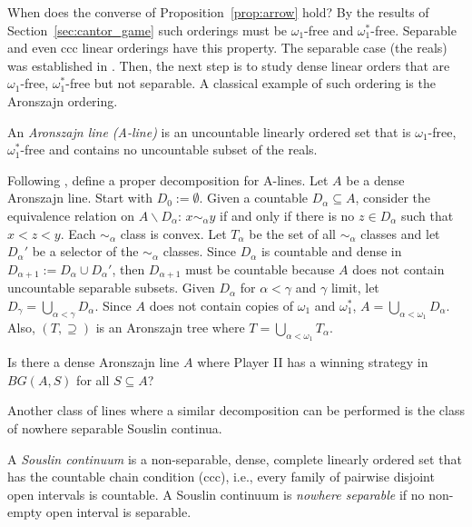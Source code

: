 When does the converse of Proposition~\ref{prop:arrow} hold?
By the results of Section~\ref{sec:cantor_game} such orderings must be $\omega_1$-free and $\omega_1^*$-free.
Separable and even ccc linear orderings have this property.
The separable case (the reals) was established in \cite{brian-clontz}.
Then, the next step is to study dense linear orders that are $\omega_1$-free, $\omega_1^*$-free but not separable.
A classical example of such ordering is the Aronszajn ordering.

\begin{definition}
    An \emph{Aronszajn line (A-line)} is an uncountable linearly ordered set that is $\omega_1$-free, $\omega_1^*$-free and contains no uncountable subset of the reals.
\end{definition}

Following \cite{A-orderings}, define a proper decomposition for A-lines.
Let $A$ be a dense Aronszajn line.
Start with $D_0:=\emptyset$.
Given a countable $D_\alpha\subseteq A$, consider the equivalence relation on $A\backslash D_\alpha$: $x\sim_\alpha y$ if and only if there is no $z\in D_\alpha$ such that $x<z<y$.
Each $\sim_\alpha$ class is convex.
Let $T_\alpha$ be the set of all $\sim_\alpha$ classes and let $D_\alpha'$ be a selector of the $\sim_\alpha$ classes.
Since $D_\alpha$ is countable and dense in $D_{\alpha+1}:=D_\alpha\cup D_\alpha'$, then $D_{\alpha+1}$ must be countable because $A$ does not contain uncountable separable subsets.
Given $D_\alpha$ for $\alpha<\gamma$ and $\gamma$ limit, let $D_\gamma=\bigcup_{\alpha<\gamma}D_\alpha$.
Since $A$ does not contain copies of $\omega_1$ and $\omega_1^*$, $A=\bigcup_{\alpha<\omega_1}D_\alpha$.
Also, $(T,\supseteq)$ is an Aronszajn tree where $T=\bigcup_{\alpha<\omega_1}T_\alpha$.

\begin{question}
    Is there a dense Aronszajn line $A$ where Player II has a winning strategy in $BG(A,S)$ for all $S\subseteq A$?
\end{question}

Another class of lines where a similar decomposition can be performed is the class of nowhere separable Souslin continua.

\begin{definition}
    A \emph{Souslin continuum} is a non-separable, dense, complete linearly ordered set that has the countable chain condition (ccc), i.e., every family of pairwise disjoint open intervals is countable.
    A Souslin continuum is \emph{nowhere separable} if no non-empty open interval is separable.
\end{definition}

